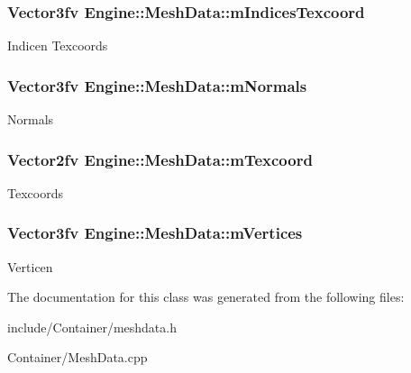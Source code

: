 \subsubsection[{m\+Indices\+Texcoord}]{\setlength{\rightskip}{0pt plus 5cm}Vector3fv Engine\+::\+Mesh\+Data\+::m\+Indices\+Texcoord}\label{classEngine_1_1MeshData_ae2dd11c142688d4fcb76477438fc68b4}
Indicen Texcoords \hypertarget{classEngine_1_1MeshData_ad304ab71be369540b57ddfe8e37791dd}{}
\subsubsection[{m\+Normals}]{\setlength{\rightskip}{0pt plus 5cm}Vector3fv Engine\+::\+Mesh\+Data\+::m\+Normals}\label{classEngine_1_1MeshData_ad304ab71be369540b57ddfe8e37791dd}
Normals \hypertarget{classEngine_1_1MeshData_af3e2c2268d968d19bedf0b3e22d5bc36}{}
\subsubsection[{m\+Texcoord}]{\setlength{\rightskip}{0pt plus 5cm}Vector2fv Engine\+::\+Mesh\+Data\+::m\+Texcoord}\label{classEngine_1_1MeshData_af3e2c2268d968d19bedf0b3e22d5bc36}
Texcoords \hypertarget{classEngine_1_1MeshData_a84ddaab255b26058eea592d0f33d348f}{}
\subsubsection[{m\+Vertices}]{\setlength{\rightskip}{0pt plus 5cm}Vector3fv Engine\+::\+Mesh\+Data\+::m\+Vertices}\label{classEngine_1_1MeshData_a84ddaab255b26058eea592d0f33d348f}
Verticen 

The documentation for this class was generated from the following files\+:\begin{DoxyCompactItemize}
\item 
include/\+Container/meshdata.\+h\item 
Container/Mesh\+Data.\+cpp\end{DoxyCompactItemize}
